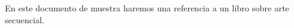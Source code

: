 \documentclass[12pt, spanish]{article}
\begin{document}
En este documento de muestra haremos una referencia a un libro sobre arte secuencial.
\nocite{*}



\end{document}
